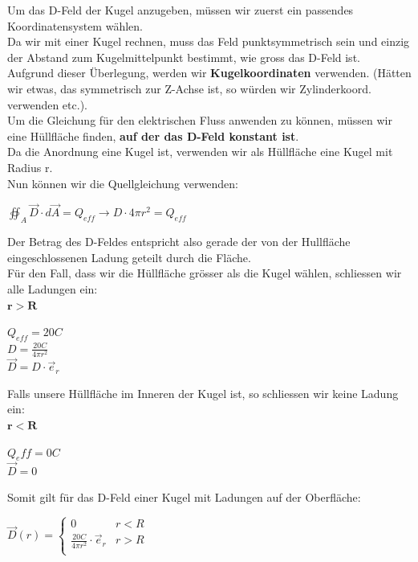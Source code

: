 \beginbsp
Um das D-Feld der Kugel anzugeben, müssen wir zuerst ein passendes Koordinatensystem wählen. \\
Da wir mit einer Kugel rechnen, muss das Feld punktsymmetrisch sein und einzig der Abstand zum Kugelmittelpunkt bestimmt, wie gross das D-Feld ist. \\
Aufgrund dieser Überlegung, werden wir \textbf{Kugelkoordinaten} verwenden. (Hätten wir etwas, das symmetrisch zur Z-Achse ist, so würden wir Zylinderkoord. verwenden etc.). \\
Um die Gleichung für den elektrischen Fluss anwenden zu können, müssen wir eine Hüllfläche finden,   \textbf{auf der das D-Feld konstant ist}. \\
Da die Anordnung eine Kugel ist, verwenden wir als Hüllfläche eine Kugel mit Radius r. \\
Nun können wir die Quellgleichung verwenden:
\begin{center}
	$ \oiint_A \vec{D}\cdot d\vec{A} = Q_{eff} \rightarrow D \cdot  4\pi r^2  = Q_{eff} $
\end{center}
Der Betrag des D-Feldes entspricht also gerade der von der Hullfläche eingeschlossenen Ladung geteilt durch die Fläche. \\
Für den Fall, dass wir die Hüllfläche grösser als die Kugel wählen, schliessen wir alle Ladungen ein: \\
$\mathbf{r > R}$ \\
\begin{center}
	$Q_{eff} = 20C$ \\
	$D = \frac{20C}{4\pi r^2}$ \\
	$\vec{D} = D \cdot \vec{e}_r$
\end{center}

Falls unsere Hüllfläche im Inneren der Kugel ist, so schliessen wir keine Ladung ein: \\
$\mathbf{r < R}$ \\
\begin{center}
	$Q_eff = 0C$ \\
	$\vec{D} = 0$
\end{center}

Somit gilt für das D-Feld einer Kugel mit Ladungen auf der Oberfläche: \\
\begin{center}

	$ \displaystyle
	\vec{D}(r) =
	\begin{cases}
		0                                       & r < R \\
		\frac{20 C}{4 \pi r^2} \cdot  \vec{e}_r & r > R \\
	\end{cases}$

\end{center}
\iend



